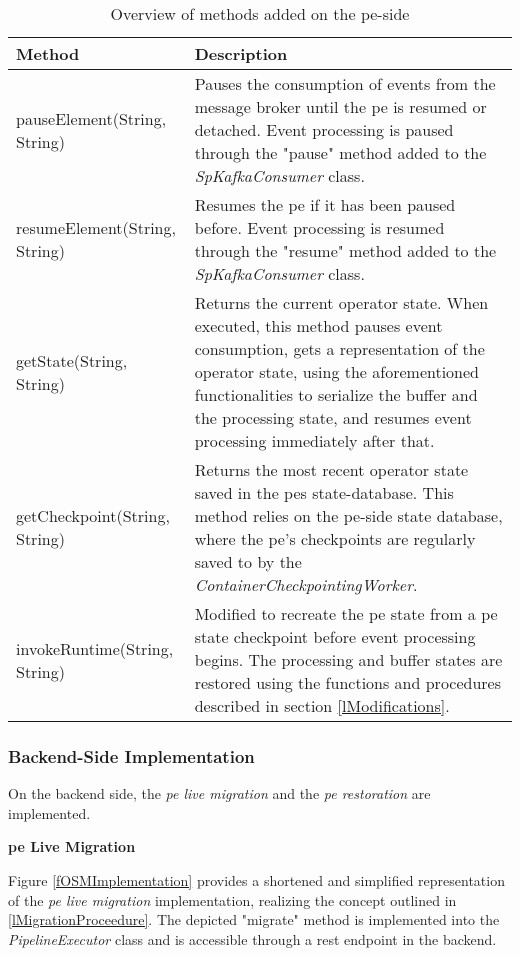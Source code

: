 \begin{table}[H]
    \caption{Overview of methods added on the \gls{pe}-side}
    \label{tNewMethods}
    \begin{tabular}{|p{5cm}|p{10cm}|}
    \hline
     \textbf{Method}&\textbf{Description}\\ 
     \hline\hline
     pauseElement(String, String)&Pauses the consumption of events from the message broker until the \gls{pe} is resumed or detached. Event processing is paused through the "pause" method added to the \textit{SpKafkaConsumer} class.\\
     \hline
     resumeElement(String, String)&Resumes the \gls{pe} if it has been paused before. Event processing is resumed through the "resume" method added to the \textit{SpKafkaConsumer} class.\\
     \hline
     getState(String, String)&Returns the current operator state. When executed, this method pauses event consumption, gets a representation of the operator state, using the aforementioned functionalities to serialize the buffer and the processing state, and resumes event processing immediately after that.\\
     \hline
     getCheckpoint(String, String)&Returns the most recent operator state saved in the \gls{pe}s state-database. This method relies on the \gls{pe}-side state database, where the \gls{pe}'s checkpoints are regularly saved to by the \textit{ContainerCheckpointingWorker}.\\
     \hline
     invokeRuntime(String, String)&Modified to recreate the \gls{pe} state from a \gls{pe} state checkpoint before event processing begins. The processing and buffer states are restored using the functions and procedures described in section \ref{lModifications}.\\
     \hline
    \end{tabular}
\end{table}

\subsubsection{Backend-Side Implementation}
\label{lBackendSideImplementation}
On the backend side, the \textit{\acrshort{pe} live migration} and the \textit{\acrshort{pe} restoration} are implemented.\par

\textbf{\acrlong{pe} Live Migration}\par
Figure \ref{fOSMImplementation} provides a shortened and simplified representation of the \textit{\acrshort{pe} live migration} implementation, realizing the concept outlined in \ref{lMigrationProceedure}. The depicted "migrate" method is implemented into the \textit{PipelineExecutor} class and is accessible through a \gls{rest} endpoint in the backend.\par





